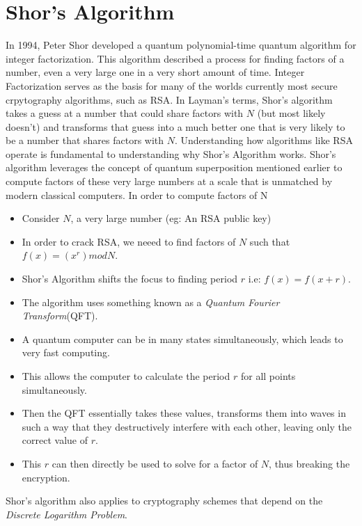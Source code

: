 \documentclass[journal]{IEEEtran}
\begin{document}
\section{Shor's Algorithm}
In 1994, Peter Shor developed a quantum polynomial-time quantum algorithm for integer factorization. This algorithm 
described a process for finding factors of a number, even a very large one in a very short amount of time. Integer Factorization
serves as the basis for many of the worlds currently most secure crpytography algorithms, such as RSA. In Layman's terms, Shor's algorithm takes
a guess at a number that could share factors with $N$ (but most likely doesn't) and transforms that guess into a much better one
that is very likely to be a number that shares factors with $N$. Understanding how algorithms like RSA operate is fundamental to understanding why Shor's Algorithm works.
Shor's algorithm leverages the concept of quantum superposition mentioned earlier to
compute factors of these very large numbers at a scale that is unmatched by modern classical computers. In order to compute factors of N
\begin{itemize}
  \item Consider $N$, a very large number (eg: An RSA public key)
  \item In order to crack RSA, we neeed to find factors of $N$ such that $f(x)=(x^r) mod N$.
  \item Shor's Algorithm shifts the focus to finding period $r$ i.e: $f(x)=f(x+r)$. 
  \item The algorithm uses something known as a \emph{Quantum Fourier Transform}(QFT).
  \item A quantum computer can be in many states simultaneously, which leads to very fast computing.
  \item This allows the computer to calculate the period $r$ for all points simultaneously.
  \item 
  Then the QFT essentially takes these values, transforms them into waves in such a way that they 
  destructively interfere with each other, leaving only the correct value of $r$.
  \item This $r$ can then directly be used to solve for a factor of $N$, thus breaking the encryption.
\end{itemize}
Shor's algorithm also applies to cryptography schemes that depend on the \emph{Discrete Logarithm Problem}.
\end{document}
